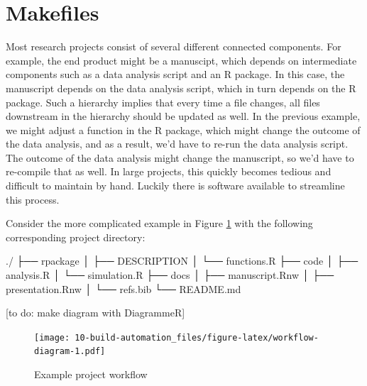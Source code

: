 \documentclass[]{book}
\newenvironment{Shaded}{\begin{snugshade}}{\end{snugshade}}
\newcommand{\ExtensionTok}[1]{#1}
\newcommand{\NormalTok}[1]{#1}
\begin{document}
\section{Makefiles}\label{makefiles}

Most research projects consist of several different connected
components. For example, the end product might be a manuscipt, which
depends on intermediate components such as a data analysis script and an
R package. In this case, the manuscript depends on the data analysis
script, which in turn depends on the R package. Such a hierarchy implies
that every time a file changes, all files downstream in the hierarchy
should be updated as well. In the previous example, we might adjust a
function in the R package, which might change the outcome of the data
analysis, and as a result, we'd have to re-run the data analysis script.
The outcome of the data analysis might change the manuscript, so we'd
have to re-compile that as well. In large projects, this quickly becomes
tedious and difficult to maintain by hand. Luckily there is software
available to streamline this process.

Consider the more complicated example in Figure
\ref{fig:workflow-diagram} with the following corresponding project
directory:

\begin{Shaded}
\begin{Highlighting}[]
\ExtensionTok{./}
\NormalTok{├── }\ExtensionTok{rpackage}
\NormalTok{│   ├── }\ExtensionTok{DESCRIPTION}
\NormalTok{│   └── }\ExtensionTok{functions.R}
\NormalTok{├── }\ExtensionTok{code}
\NormalTok{│   ├── }\ExtensionTok{analysis.R}
\NormalTok{│   └── }\ExtensionTok{simulation.R}
\NormalTok{├── }\ExtensionTok{docs}
\NormalTok{│   ├── }\ExtensionTok{manuscript.Rnw}
\NormalTok{│   ├── }\ExtensionTok{presentation.Rnw}
\NormalTok{│   └── }\ExtensionTok{refs.bib}
\NormalTok{└── }\ExtensionTok{README.md}
\end{Highlighting}
\end{Shaded}

{[}to do: make diagram with DiagrammeR{]}

\begin{figure}
\centering
\texttt{[image: 10-build-automation\_files/figure-latex/workflow-diagram-1.pdf]}
\caption{\label{fig:workflow-diagram}Example project workflow}
\end{figure}
\end{document}
